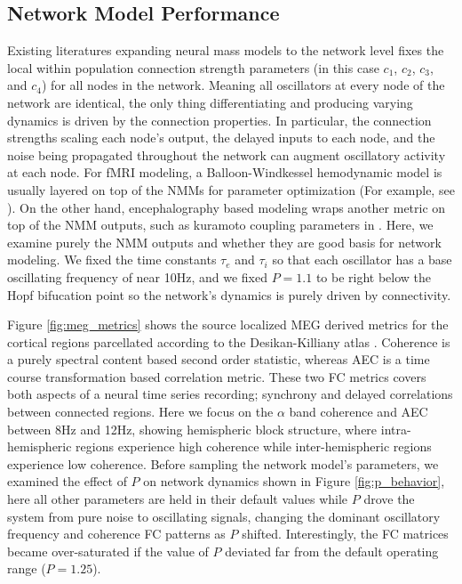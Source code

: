 \subsection{Network Model Performance}
Existing literatures expanding neural mass models to the network level fixes the local within population connection strength parameters (in this case $c_1$, $c_2$, $c_3$, and $c_4$) for all nodes in the network. Meaning all oscillators at every node of the network are identical, the only thing differentiating and producing varying dynamics is driven by the connection properties. In particular, the connection strengths scaling each node's output, the delayed inputs to each node, and the noise being propagated throughout the network can augment oscillatory activity at each node. For fMRI modeling, a Balloon-Windkessel hemodynamic model \cite{buxton_dynamics_1998, friston_nonlinear_2000} is usually layered on top of the NMMs for parameter optimization (For example, see \cite{Zimmermann2018}). On the other hand, encephalography based modeling wraps another metric on top of the NMM outputs, such as kuramoto coupling parameters in \cite{Deco2009}. Here, we examine purely the NMM outputs and whether they are good basis for network modeling. We fixed the time constants $\tau_e$ and $\tau_i$ so that each oscillator has a base oscillating frequency of near 10Hz, and we fixed $P = 1.1$ to be right below the Hopf bifucation point so the network's dynamics is purely driven by connectivity. 

Figure \ref{fig:meg_metrics} shows the source localized MEG derived metrics for the cortical regions parcellated according to the Desikan-Killiany atlas \cite{Desikan2006}. Coherence is a purely spectral content based second order statistic, whereas AEC is a time course transformation based correlation metric. These two FC metrics covers both aspects of a neural time series recording; synchrony and delayed correlations between connected regions. Here we focus on the $\alpha$ band coherence and AEC between 8Hz and 12Hz, showing hemispheric block structure, where intra-hemispheric regions experience high coherence while inter-hemispheric regions experience low coherence. Before sampling the network model's parameters, we examined the effect of $P$ on network dynamics shown in Figure \ref{fig:p_behavior}, here all other parameters are held in their default values while $P$ drove the system from pure  noise to oscillating signals, changing the dominant oscillatory frequency and coherence FC patterns as $P$ shifted. Interestingly, the FC matrices became over-saturated if the value of $P$ deviated far from the default operating range ($P=1.25$).

